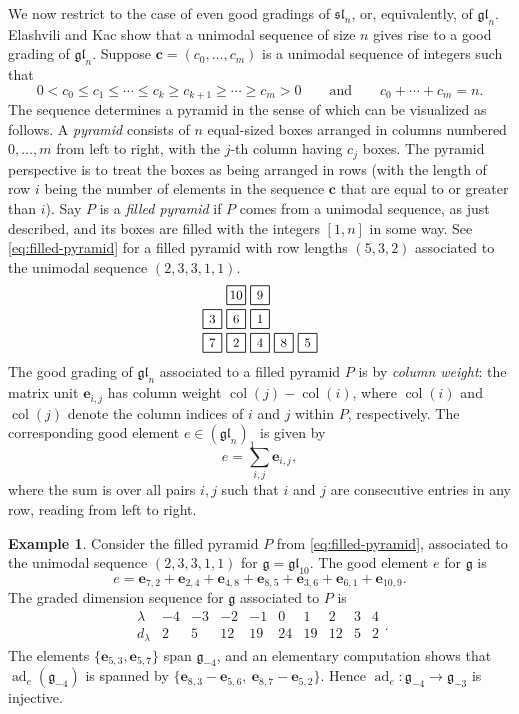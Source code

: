 \documentclass{amsart}
\newcommand{\demph}[1]{\textcolor{myblue}{\emph{#1}}}
\renewcommand{\demph}[1]{\emph{#1}}
\def\bc{\mathbf{c}}
\def\be{\mathbf{e}}
\def\fg{\mathfrak g} %
\def\sl{\mathfrak{sl}}
\def\gl{\mathfrak{gl}}
\def\sln{\sl_n}
\def\gln{\gl_n}
\def\ad{\operatorname{ad}}
\def\col{\operatorname{col}}
\theoremstyle{definition}
\newtheorem{example}[theorem]{Example}%
\begin{document}
We now restrict to the case of even good gradings of $\sln$, or, equivalently, of $\gln$. Elashvili and Kac \cite[Proposition~4.3]{elashvili2005classification} show that a unimodal sequence of size $n$ gives rise to a good grading of $\gln$. Suppose $\bc=(c_0,\ldots ,c_m)$ is a unimodal sequence of integers such that
\[0<c_0\leq c_1\leq \cdots \leq  c_k\geq  c_{k+1}\geq \cdots \geq c_m>0\qquad \text{and}\qquad c_0+\cdots +c_m=n.\]
The sequence determines a {pyramid} in the sense of \cite[Section~4]{elashvili2005classification} which can be visualized as follows. A \demph{pyramid} consists of $n$ equal-sized boxes arranged in columns numbered $0, ..., m$ from left to right, with the $j$-th column having $c_j$ boxes. The {pyramid} perspective is to treat the boxes as being arranged in rows (with the length of row $i$ being the number of elements in the sequence $\bc$ that are equal to or greater than $i$). 
Say $P$ is a \demph{filled pyramid} if $P$ comes from a unimodal sequence, as just described, and its boxes are filled with the integers $[1,n]$ in some way. See \eqref{eq:filled-pyramid} for a filled pyramid with row lengths $(5,3,2)$ associated to the unimodal sequence $(2,3,3,1,1)$.
\begin{gather}
\label{eq:filled-pyramid}
\raisebox{-.5\height}{\fskyline{{7,3},{2,6,10},{4,1,9},{8},{5}}}
\end{gather}
The good grading of $\gln$ associated to a filled pyramid $P$ is by \demph{column weight}: the matrix unit $\be_{i,j}$ has column weight $\col(j)-\col(i)$, where $\col(i)$ and $\col(j)$ denote the column indices of $i$ and $j$ within $P$, respectively. 
The corresponding good element $e\in(\gln)_1$ is given by 
\begin{equation}
\label{eq:nilpotent-e}
    e=\sum_{i,j}\be_{i,j},
\end{equation}
where the sum is over all pairs $i,j$ such that $i$ and $j$ are consecutive entries in any row, reading from left to right. 

\begin{example} 
Consider the filled pyramid $P$ from \eqref{eq:filled-pyramid}, associated to the unimodal sequence $(2,3,3,1,1)$ for $\fg=\gl_{10}$. The good element $e$ for $\fg$ is 
\[
    e =\be_{7,2}+\be_{2,4}+\be_{4,8}+\be_{8,5}
    +\be_{3,6}+\be_{6,1}
    +\be_{10,9}.
\]
The graded dimension sequence for $\fg$ associated to $P$ is
\[
    \begin{array}{c|rrrrrrrrr}
    \lambda & -4 & -3 & -2 & -1 & 0 & 1 & 2 & 3 & 4 \\
    \hline
    d_\lambda & 2 & 5 & 12 & 19 & 24 & 19 & 12 & 5 & 2
    \end{array}.
\]
The elements 
$\bigl\{\be_{5,3}, \be_{5,7} \bigr\}$ span $\fg_{-4}$, 
and an elementary computation shows that $\ad_{e}(\fg_{-4})$ is spanned by
$
    \bigl\{\be_{8,3}-\be_{5,6}, \ 
    \be_{8,7}-\be_{5,2} 
    \bigr\}.
$
Hence $\ad_e: \fg_{-4}\rightarrow \fg_{-3}$ is injective.
\end{example}
\end{document}
